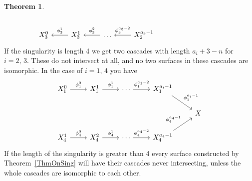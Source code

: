 \documentclass[11pt]{amsbook}
\theoremstyle{definition}
\newtheorem{thm}{Theorem}[section]
\theoremstyle{definition}
\theoremstyle{definition}
\theoremstyle{definition}
\theoremstyle{definition}
\theoremstyle{definition}
\theoremstyle{definition}
\theoremstyle{definition}
\begin{document}
\begin{thm}
\[\begin{tikzcd}
        &                                  &                                &                                                                 &  &                                                                    &                          &                          \\
X_{3}^0 & X_{3}^1 \arrow[l, "\phi_{3}^1"'] & \dots \arrow[l, "\phi_{3}^2"'] & X_{2}^{a_3-1} \arrow[l, "\phi_{3}^{a_3-2}"']                    &  &                                                                    &                          &                         
\end{tikzcd}
\]
If the singularity is length 4 we get two cascades with length $a_i + 3 - n$ for $ i = 2, \, 3$. These do not intersect at all, and no two surfaces in these cascades are isomorphic. In the case of $i = 1, \, 4$ you have 
\[
\begin{tikzcd}
X_{1}^0 \arrow[r, "\phi_1^0"] & X_{1}^1 \arrow[r, "\phi_1^1"] & \cdots \arrow[r, "\phi_1^{a_1-2}"] & X_1^{a_i-1} \arrow[rd, "\phi_1^{a_i-1}"] &   \\
                              &                               &                                    &                                          & X \\
X_4^1 \arrow[r, "\phi_4^0"]   & X_4^2 \arrow[r, "\phi_4^1"]   & \cdots \arrow[r, "\phi_4^{a_4-2}"] & X_4^{a_4-1} \arrow[ru, "\phi_4^{a_4-1}"] &  
\end{tikzcd}
\]
If the length of the singularity is greater than 4 every surface constructed by Theorem~\ref{ThmOnSing} will have their cascades never intersecting, unless the whole cascades are isomorphic to each other.
\end{thm}
\end{document}
